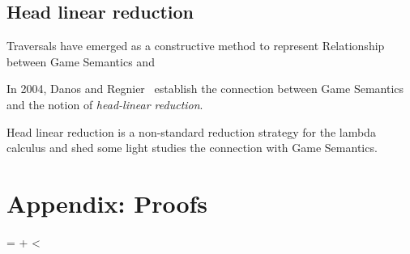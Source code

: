 \documentclass{article}
\makeatletter
\newcounter{proofcount}
\def\printproofs{%
    \count@=\z@
    \loop
    \the\toks\numexpr\prooftoks+\count@\relax
    \ifnum\count@<\value{proofcount}%
    \advance\count@\@ne
    \repeat}
\theoremstyle{plain}
\theoremstyle{definition}
\theoremstyle{remark}
\makeatother
\begin{document}
\subsection{Head linear reduction}

Traversals have emerged as a constructive method to represent
Relationship between Game Semantics and

In 2004, Danos and Regnier~\cite{danos-head} establish the connection between Game Semantics and the notion of \emph{head-linear reduction}.

Head linear reduction is  a non-standard reduction strategy for the lambda calculus and shed some light studies the connection with Game Semantics.




\appendix

\section*{Appendix: Proofs}

\printproofs

%
\end{document}

